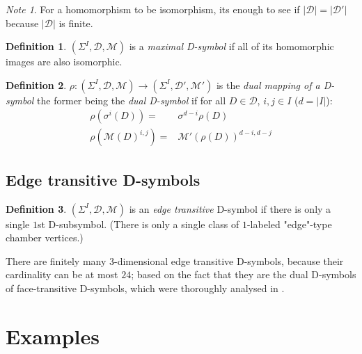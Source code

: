 \documentclass[12pt,a4paper]{article}
\theoremstyle{plain}%
\newtheorem{prop}[thm]{Proposition}
\theoremstyle{definition}
\newtheorem{defn}{Definition}[section]
\theoremstyle{remark}
\newtheorem*{note}{Note}
\begin{document}
\begin{note}
  For a homomorphism to be isomorphism, its enough to see if
  $|\mathcal{D}|=|\mathcal{D}'|$ because $|\mathcal{D}|$ is finite.
\end{note}

\begin{defn}
  $(\Sigma^I,\mathcal{D},\mathcal{M})$ is a {\em maximal D-symbol} if all of its
  homomorphic images are also isomorphic.
\end{defn}

\begin{defn}
  $\rho: (\Sigma^I,\mathcal{D},\mathcal{M}) \rightarrow
  (\Sigma^I,\mathcal{D}',\mathcal{M}')$ is the {\em dual mapping of a D-symbol}
  the former being the {\em dual D-symbol} if for all $D\in \mathcal{D}$, $i,j
  \in I$ ($d=|I|$):
  \begin{align}
    \rho(\sigma^i(D))= & \sigma^{d-i}\rho(D) \\
    \rho(\mathcal{M}(D)^{i,j})= & \mathcal{M}'(\rho(D))^{d-i,d-j}
  \end{align}
\end{defn}


\subsection{Edge transitive D-symbols}
\label{sec:edge_transitive}

\begin{defn}
  $(\Sigma^I,\mathcal{D},\mathcal{M})$ is an {\em edge transitive} D-symbol if
  there is only a single $1$st D-subsymbol. (There is only a single class of
  $1$-labeled "edge"-type chamber vertices.)
\end{defn}

There are finitely many $3$-dimensional edge transitive D-symbols, because their
cardinality can be at most $24$; based on the fact that they are the dual
D-symbols of face-transitive D-symbols, which were thoroughly analysed in
\cite{DHM93}.

\section{Examples}
\end{document}
